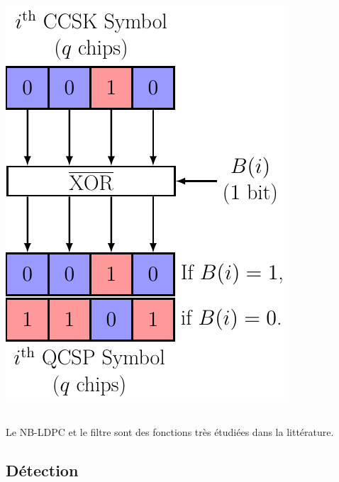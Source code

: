 \documentclass[../main.tex]{subfiles}
\begin{document}
\begin{frame}{\subsecname}
\begin{columns}
\begin{column}{.35\linewidth}
\begin{overlayarea}{\linewidth}{.5\textheight}
        \includegraphics[width=\linewidth, height=.55\textheight, keepaspectratio = true]{figures/tikzpicture/ovmod_simd_stdl.pdf}
      \end{overlayarea}
    \end{column}
  \end{columns}

  \vspace{4 em}

  \begin{center}
    Le NB-LDPC et le filtre sont des fonctions très étudiées dans la littérature.
  \end{center}
\end{frame}

\subsection{Détection}
\end{document}
